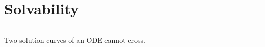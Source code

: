\section{Solvability}
\noindent\rule[\linienAbstand]{\linewidth}{\linienDickeDick}
Two solution curves of an ODE cannot cross.
